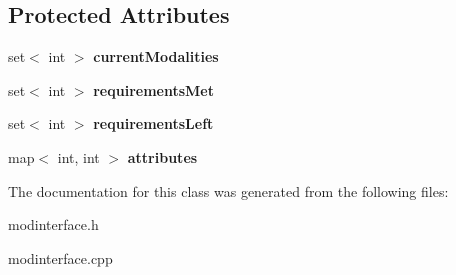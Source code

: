 \subsection*{\-Protected \-Attributes}
\begin{DoxyCompactItemize}
\item 
\hypertarget{classModInterface_a3a895bb053838799a762fb21615904ff}{set$<$ int $>$ {\bfseries current\-Modalities}}\label{classModInterface_a3a895bb053838799a762fb21615904ff}

\item 
\hypertarget{classModInterface_ad600e3ded3f2ac744707bef15ac9baf1}{set$<$ int $>$ {\bfseries requirements\-Met}}\label{classModInterface_ad600e3ded3f2ac744707bef15ac9baf1}

\item 
\hypertarget{classModInterface_af098c08b5051e9de0c6c80932cd8e63a}{set$<$ int $>$ {\bfseries requirements\-Left}}\label{classModInterface_af098c08b5051e9de0c6c80932cd8e63a}

\item 
\hypertarget{classModInterface_a5ed9bd33017014ebe9fc4ef2f51d2229}{map$<$ int, int $>$ {\bfseries attributes}}\label{classModInterface_a5ed9bd33017014ebe9fc4ef2f51d2229}

\end{DoxyCompactItemize}


\-The documentation for this class was generated from the following files\-:\begin{DoxyCompactItemize}
\item 
modinterface.\-h\item 
modinterface.\-cpp\end{DoxyCompactItemize}
